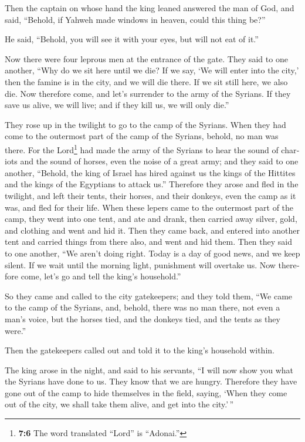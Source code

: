 \begin{paracol}{2}
\begin{otherlanguage}{english}
 Then the captain on whose hand the king leaned answered
the man of God, and said, ``Behold, if Yahweh made windows in heaven,
could this thing be?''

He said, ``Behold, you will see it with your eyes, but will not eat of
it.''

 Now there were four leprous men at the entrance of the
gate. They said to one another, ``Why do we sit here until we die?
 If we say, `We will enter into the city,' then the famine
is in the city, and we will die there. If we sit still here, we also
die. Now therefore come, and let's surrender to the army of the Syrians.
If they save us alive, we will live; and if they kill us, we will only
die.''

 They rose up in the twilight to go to the camp of the
Syrians. When they had come to the outermost part of the camp of the
Syrians, behold, no man was there.  For the
Lord\footnote{\textbf{7:6} The word translated ``Lord'' is ``Adonai.''}
had made the army of the Syrians to hear the sound of chariots and the
sound of horses, even the noise of a great army; and they said to one
another, ``Behold, the king of Israel has hired against us the kings of
the Hittites and the kings of the Egyptians to attack us.''
 Therefore they arose and fled in the twilight, and left
their tents, their horses, and their donkeys, even the camp as it was,
and fled for their life.  When these lepers came to the
outermost part of the camp, they went into one tent, and ate and drank,
then carried away silver, gold, and clothing and went and hid it. Then
they came back, and entered into another tent and carried things from
there also, and went and hid them.  Then they said to one
another, ``We aren't doing right. Today is a day of good news, and we
keep silent. If we wait until the morning light, punishment will
overtake us. Now therefore come, let's go and tell the king's
household.''

 So they came and called to the city gatekeepers; and
they told them, ``We came to the camp of the Syrians, and, behold, there
was no man there, not even a man's voice, but the horses tied, and the
donkeys tied, and the tents as they were.''

 Then the gatekeepers called out and told it to the
king's household within.

 The king arose in the night, and said to his servants,
``I will now show you what the Syrians have done to us. They know that
we are hungry. Therefore they have gone out of the camp to hide
themselves in the field, saying, `When they come out of the city, we
shall take them alive, and get into the city.'\,''


\end{otherlanguage}
\end{paracol}
